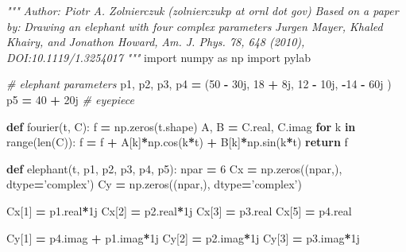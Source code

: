 \documentclass[]{book}
\newenvironment{Shaded}{\begin{snugshade}}{\end{snugshade}}
\newcommand{\KeywordTok}[1]{\textcolor[rgb]{0.13,0.29,0.53}{\textbf{{#1}}}}
\newcommand{\DecValTok}[1]{\textcolor[rgb]{0.00,0.00,0.81}{{#1}}}
\newcommand{\StringTok}[1]{\textcolor[rgb]{0.31,0.60,0.02}{{#1}}}
\newcommand{\ImportTok}[1]{{#1}}
\newcommand{\CommentTok}[1]{\textcolor[rgb]{0.56,0.35,0.01}{\textit{{#1}}}}
\newcommand{\OtherTok}[1]{\textcolor[rgb]{0.56,0.35,0.01}{{#1}}}
\newcommand{\ControlFlowTok}[1]{\textcolor[rgb]{0.13,0.29,0.53}{\textbf{{#1}}}}
\newcommand{\OperatorTok}[1]{\textcolor[rgb]{0.81,0.36,0.00}{\textbf{{#1}}}}
\newcommand{\BuiltInTok}[1]{{#1}}
\newcommand{\NormalTok}[1]{{#1}}
\begin{document}
\begin{Shaded}
\begin{Highlighting}[]
\CommentTok{"""}
\CommentTok{Author: Piotr A. Zolnierczuk (zolnierczukp at ornl dot gov)}
\CommentTok{ }
\CommentTok{Based on a paper by:}
\CommentTok{Drawing an elephant with four complex parameters}
\CommentTok{Jurgen Mayer, Khaled Khairy, and Jonathon Howard,}
\CommentTok{Am. J. Phys. 78, 648 (2010), DOI:10.1119/1.3254017}
\CommentTok{"""}
\ImportTok{import} \NormalTok{numpy }\ImportTok{as} \NormalTok{np}
\ImportTok{import} \NormalTok{pylab}
 
\CommentTok{# elephant parameters}
\NormalTok{p1, p2, p3, p4 }\OperatorTok{=} \NormalTok{(}\DecValTok{50} \OperatorTok{-} \NormalTok{30j, }\DecValTok{18} \OperatorTok{+}  \NormalTok{8j, }\DecValTok{12} \OperatorTok{-} \NormalTok{10j, }\OperatorTok{-}\DecValTok{14} \OperatorTok{-} \NormalTok{60j )}
\NormalTok{p5 }\OperatorTok{=} \DecValTok{40} \OperatorTok{+}\OtherTok{ 20j} \CommentTok{# eyepiece}
 
\KeywordTok{def} \NormalTok{fourier(t, C):}
    \NormalTok{f }\OperatorTok{=} \NormalTok{np.zeros(t.shape)}
    \NormalTok{A, B }\OperatorTok{=} \NormalTok{C.real, C.imag}
    \ControlFlowTok{for} \NormalTok{k }\OperatorTok{in} \BuiltInTok{range}\NormalTok{(}\BuiltInTok{len}\NormalTok{(C)):}
        \NormalTok{f }\OperatorTok{=} \NormalTok{f }\OperatorTok{+} \NormalTok{A[k]}\OperatorTok{*}\NormalTok{np.cos(k}\OperatorTok{*}\NormalTok{t) }\OperatorTok{+} \NormalTok{B[k]}\OperatorTok{*}\NormalTok{np.sin(k}\OperatorTok{*}\NormalTok{t)}
    \ControlFlowTok{return} \NormalTok{f}
 
\KeywordTok{def} \NormalTok{elephant(t, p1, p2, p3, p4, p5):}
    \NormalTok{npar }\OperatorTok{=} \DecValTok{6}
    \NormalTok{Cx }\OperatorTok{=} \NormalTok{np.zeros((npar,), dtype}\OperatorTok{=}\StringTok{'complex'}\NormalTok{)}
    \NormalTok{Cy }\OperatorTok{=} \NormalTok{np.zeros((npar,), dtype}\OperatorTok{=}\StringTok{'complex'}\NormalTok{)}
 
    \NormalTok{Cx[}\DecValTok{1}\NormalTok{] }\OperatorTok{=} \NormalTok{p1.real}\OperatorTok{*}\NormalTok{1j}
    \NormalTok{Cx[}\DecValTok{2}\NormalTok{] }\OperatorTok{=} \NormalTok{p2.real}\OperatorTok{*}\NormalTok{1j}
    \NormalTok{Cx[}\DecValTok{3}\NormalTok{] }\OperatorTok{=} \NormalTok{p3.real}
    \NormalTok{Cx[}\DecValTok{5}\NormalTok{] }\OperatorTok{=} \NormalTok{p4.real}
 
    \NormalTok{Cy[}\DecValTok{1}\NormalTok{] }\OperatorTok{=} \NormalTok{p4.imag }\OperatorTok{+} \NormalTok{p1.imag}\OperatorTok{*}\NormalTok{1j}
    \NormalTok{Cy[}\DecValTok{2}\NormalTok{] }\OperatorTok{=} \NormalTok{p2.imag}\OperatorTok{*}\NormalTok{1j}
    \NormalTok{Cy[}\DecValTok{3}\NormalTok{] }\OperatorTok{=} \NormalTok{p3.imag}\OperatorTok{*}\NormalTok{1j}
 

\end{Highlighting}
\end{Shaded}
\end{document}
